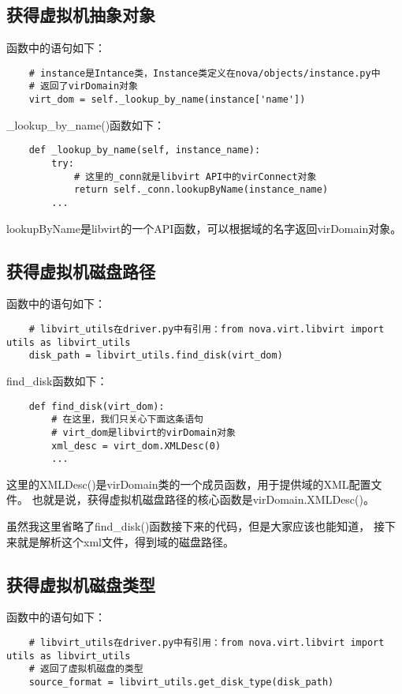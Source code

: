 \documentclass[a4paper,left=1.5cm,right=1.5cm,11pt]{article}
\begin{document}
\clearpage

\subsection{获得虚拟机抽象对象}
	函数中的语句如下：
	\begin{lstlisting}
	# instance是Intance类，Instance类定义在nova/objects/instance.py中
	# 返回了virDomain对象
	virt_dom = self._lookup_by_name(instance['name'])
	\end{lstlisting}

	\_lookup\_by\_name()函数如下：
	\begin{lstlisting}
	def _lookup_by_name(self, instance_name):
        try:
			# 这里的_conn就是libvirt API中的virConnect对象
            return self._conn.lookupByName(instance_name)
        ...
	\end{lstlisting}

	lookupByName是libvirt的一个API函数，可以根据域的名字返回virDomain对象。

\subsection{获得虚拟机磁盘路径}
	函数中的语句如下：
	\begin{lstlisting}
	# libvirt_utils在driver.py中有引用：from nova.virt.libvirt import utils as libvirt_utils
	disk_path = libvirt_utils.find_disk(virt_dom)
	\end{lstlisting}

	find\_disk函数如下：
	\begin{lstlisting}
	def find_disk(virt_dom):
		# 在这里，我们只关心下面这条语句
		# virt_dom是libvirt的virDomain对象
		xml_desc = virt_dom.XMLDesc(0)
		...
	\end{lstlisting}

	这里的XMLDesc()是virDomain类的一个成员函数，用于提供域的XML配置文件。
	也就是说，获得虚拟机磁盘路径的核心函数是virDomain.XMLDesc()。\par

	虽然我这里省略了find\_disk()函数接下来的代码，但是大家应该也能知道，
	接下来就是解析这个xml文件，得到域的磁盘路径。

\subsection{获得虚拟机磁盘类型}
	函数中的语句如下：
	\begin{lstlisting}
	# libvirt_utils在driver.py中有引用：from nova.virt.libvirt import utils as libvirt_utils
	# 返回了虚拟机磁盘的类型
	source_format = libvirt_utils.get_disk_type(disk_path)
	\end{lstlisting}
\end{document}

